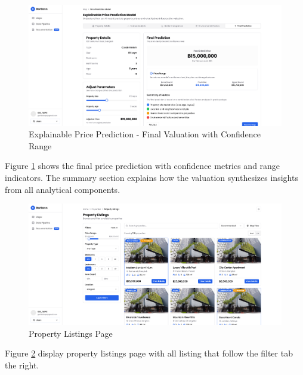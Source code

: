 \pagebreak
\begin{figure}[h]
\centering
\includegraphics[width=1\textwidth]{assets/ui/explainable-final-prediction.png}
\caption{Explainable Price Prediction - Final Valuation with Confidence Range}
\label{fig:explainable-final-prediction}
\end{figure}

Figure \ref{fig:explainable-final-prediction} shows the final price prediction with confidence metrics and range indicators. The summary section explains how the valuation synthesizes insights from all analytical components.

\begin{figure}[h]
\centering
\includegraphics[width=1\textwidth]{assets/ui/property-listing-main.png}
\caption{Property Listings Page}
\label{fig:property-listing-main}
\end{figure}

Figure \ref{fig:property-listing-main} display property listings page with all listing that follow the filter tab the right.

